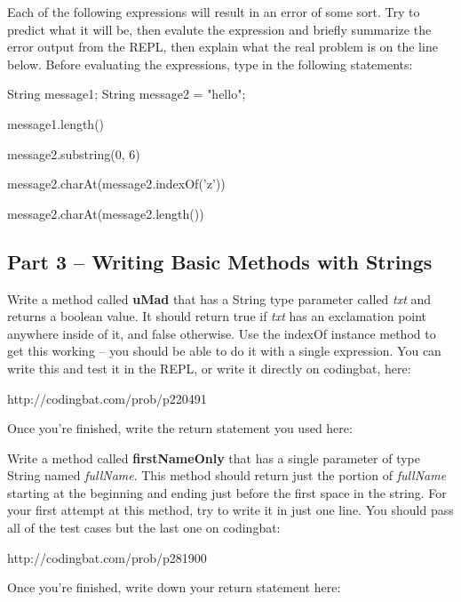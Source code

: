 \begin{eval}
Each of the following expressions will result in an error of some sort. Try to predict what it will be, then evalute the expression and briefly summarize the error output from the REPL, then  explain what the real problem is on the line below. Before evaluating the expressions, type in the following statements:

\begin{code}
String message1;
String message2 = "hello";
\end{code}

\begin{sevalenum}
\item message1.length()
\evallinethree
\item message2.substring(0, 6)
\evallinethree
\item message2.charAt(message2.indexOf('z'))
\evallinethree
\item message2.charAt(message2.length())
\evallinethree
\end{sevalenum}
\end{eval}


\initialbox

\subsection{Part 3 -- Writing Basic Methods with Strings}

\begin{exer}
Write a method called \textbf{uMad} that has a String type parameter called \textit{txt} and returns a boolean value. It should return true if \textit{txt} has an exclamation point anywhere inside of it, and false otherwise. Use the indexOf instance method to get this working -- you should be able to do it with a single expression. You can write this and test it in the REPL, or write it directly on codingbat, here:

http://codingbat.com/prob/p220491

Once you're finished, write the return statement you used here:

\evalline

\end{exer}

\begin{exer}
Write a method called \textbf{firstNameOnly} that has a single parameter of type String named \textit{fullName}. This method should return just the portion of \textit{fullName} starting at the beginning and ending just before the first space in the string. For your first attempt at this method, try to write it in just one line. You should pass all of the test cases but the last one on codingbat:

http://codingbat.com/prob/p281900

Once you're finished, write down your return statement here:

\evalline

\end{exer}

